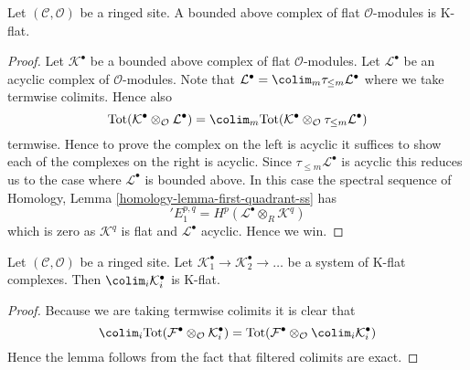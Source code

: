 \begin{lemma}
\label{lemma-bounded-flat-K-flat}
Let $(\mathcal{C}, \mathcal{O})$ be a ringed site. A bounded above complex
of flat $\mathcal{O}$-modules is K-flat.
\end{lemma}

\begin{proof}
Let $\mathcal{K}^\bullet$ be a bounded above complex of flat
$\mathcal{O}$-modules. Let $\mathcal{L}^\bullet$ be an acyclic complex
of $\mathcal{O}$-modules. Note that
$\mathcal{L}^\bullet = \colim_m \tau_{\leq m}\mathcal{L}^\bullet$
where we take termwise colimits. Hence also
$$
\text{Tot}(\mathcal{K}^\bullet \otimes_\mathcal{O} \mathcal{L}^\bullet)
=
\colim_m \text{Tot}(
\mathcal{K}^\bullet \otimes_\mathcal{O} \tau_{\leq m}\mathcal{L}^\bullet)
$$
termwise. Hence to prove the complex on the left is acyclic it suffices
to show each of the complexes on the right is acyclic. Since
$\tau_{\leq m}\mathcal{L}^\bullet$ is acyclic this reduces us to the
case where $\mathcal{L}^\bullet$ is bounded above.
In this case the spectral sequence of
Homology, Lemma \ref{homology-lemma-first-quadrant-ss}
has
$$
{}'E_1^{p, q} = H^p(\mathcal{L}^\bullet \otimes_R \mathcal{K}^q)
$$
which is zero as $\mathcal{K}^q$ is flat and $\mathcal{L}^\bullet$ acyclic.
Hence we win.
\end{proof}

\begin{lemma}
\label{lemma-colimit-K-flat}
Let $(\mathcal{C}, \mathcal{O})$ be a ringed site.
Let $\mathcal{K}_1^\bullet \to \mathcal{K}_2^\bullet \to \ldots$
be a system of K-flat complexes.
Then $\colim_i \mathcal{K}_i^\bullet$ is K-flat.
\end{lemma}

\begin{proof}
Because we are taking termwise colimits it is clear that
$$
\colim_i \text{Tot}(
\mathcal{F}^\bullet \otimes_\mathcal{O} \mathcal{K}_i^\bullet)
=
\text{Tot}(\mathcal{F}^\bullet \otimes_\mathcal{O}
\colim_i \mathcal{K}_i^\bullet)
$$
Hence the lemma follows from the fact that filtered colimits are
exact.
\end{proof}

